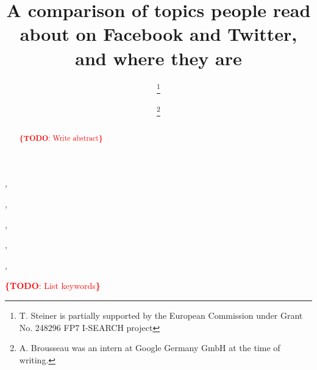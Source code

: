 \documentclass{iosart2c}
\newcommand{\todo}[1]{\noindent\textcolor{red}{{\bf \{TODO}: #1{\bf \}}}}
\begin{document}
\begin{frontmatter}

\title{A comparison of topics people read about on Facebook and Twitter, and where they are}




\author[A]{ \thanks{T. Steiner is partially supported by the European Commission under Grant No. 248296 FP7 I-SEARCH project}},
\author[B]{ \thanks{A. Brousseau was an intern at Google Germany GmbH at the time of writing.}},
\author[C]{ },
\author[D]{ },
\author[E]{ },
\author[F]{ }


\address[A]{Google Germany GmbH, ABC-Str. 19, 20354 Hamburg, Germany,\\
E-mail: tomac@google.com}
\address[B]{Google Germany GmbH, ABC-Str. 19, 20354 Hamburg, Germany,\\ 
E-mail: arnaud.brousseau@gmail.com}
\address[C]{EURECOM, Sophia Antipolis, France\\
E-mail: raphael.troncy@eurecom.fr}
\address[D]{Ghent University -- IBBT, ELIS, Multimedia Lab, Gaston Crommenlaan 8/201, 9050 Ghent, Belgium,\\
E-mail: ruben.verborgh@ugent.be}
\address[E]{Ghent University -- IBBT, ELIS, Multimedia Lab, Gaston Crommenlaan 8/201, 9050 Ghent, Belgium,\\
E-mail: rik.vandewalle@ugent.be}
\address[F]{Universitat Polit\`{e}cnica de Catalunya, Department LSI, 08034 Barcelona, Spain,\\
E-mail: gabarro@lsi.upc.edu}

\begin{abstract}
\todo{Write abstract}
\end{abstract}

\begin{keyword}
\todo{List keywords}
\end{keyword}

\end{frontmatter}
\end{document}
